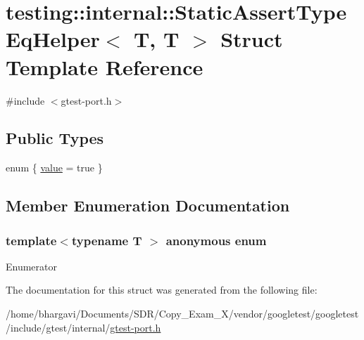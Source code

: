 \hypertarget{structtesting_1_1internal_1_1_static_assert_type_eq_helper_3_01_t_00_01_t_01_4}{}\section{testing\+:\+:internal\+:\+:Static\+Assert\+Type\+Eq\+Helper$<$ T, T $>$ Struct Template Reference}
\label{structtesting_1_1internal_1_1_static_assert_type_eq_helper_3_01_t_00_01_t_01_4}


{\ttfamily \#include $<$gtest-\/port.\+h$>$}

\subsection*{Public Types}
\begin{DoxyCompactItemize}
\item 
enum \{ \hyperlink{structtesting_1_1internal_1_1_static_assert_type_eq_helper_3_01_t_00_01_t_01_4_acdb69a9c4164628ea6a80bd6442058c6a63c475f543e4e977d43c5093dd2b7f3f}{value} = true
 \}
\end{DoxyCompactItemize}


\subsection{Member Enumeration Documentation}
\subsubsection[{\texorpdfstring{anonymous enum}{anonymous enum}}]{\setlength{\rightskip}{0pt plus 5cm}template$<$typename T $>$ anonymous enum}\hypertarget{structtesting_1_1internal_1_1_static_assert_type_eq_helper_3_01_t_00_01_t_01_4_acdb69a9c4164628ea6a80bd6442058c6}{}\label{structtesting_1_1internal_1_1_static_assert_type_eq_helper_3_01_t_00_01_t_01_4_acdb69a9c4164628ea6a80bd6442058c6}
\begin{Desc}
\item[Enumerator]\par
\begin{description}
\item[{\em 
value\hypertarget{structtesting_1_1internal_1_1_static_assert_type_eq_helper_3_01_t_00_01_t_01_4_acdb69a9c4164628ea6a80bd6442058c6a63c475f543e4e977d43c5093dd2b7f3f}{}\label{structtesting_1_1internal_1_1_static_assert_type_eq_helper_3_01_t_00_01_t_01_4_acdb69a9c4164628ea6a80bd6442058c6a63c475f543e4e977d43c5093dd2b7f3f}
}]\end{description}
\end{Desc}


The documentation for this struct was generated from the following file\+:\begin{DoxyCompactItemize}
\item 
/home/bhargavi/\+Documents/\+S\+D\+R/\+Copy\+\_\+\+Exam\+\_\+X/vendor/googletest/googletest/include/gtest/internal/\hyperlink{gtest-port_8h}{gtest-\/port.\+h}\end{DoxyCompactItemize}
